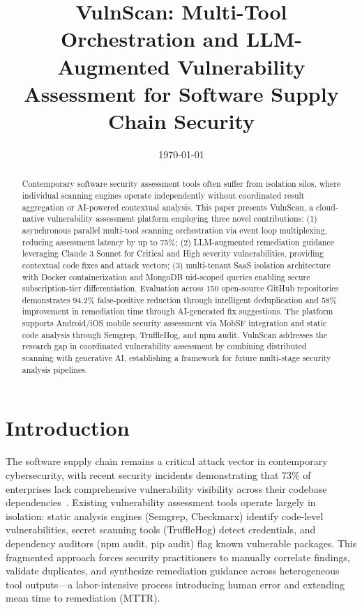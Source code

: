 \documentclass[10pt, conference, compsocconf]{IEEEtran}
\title{VulnScan: Multi-Tool Orchestration and LLM-Augmented Vulnerability Assessment for Software Supply Chain Security}
\author{
\IEEEauthorblockN{Anonymous Submission}
}
\date{\today}
\begin{document}
\maketitle

\begin{abstract}
Contemporary software security assessment tools often suffer from isolation silos, where individual scanning engines operate independently without coordinated result aggregation or AI-powered contextual analysis. This paper presents VulnScan, a cloud-native vulnerability assessment platform employing three novel contributions: (1) asynchronous parallel multi-tool scanning orchestration via event loop multiplexing, reducing assessment latency by up to 75\%; (2) LLM-augmented remediation guidance leveraging Claude 3 Sonnet for Critical and High severity vulnerabilities, providing contextual code fixes and attack vectors; (3) multi-tenant SaaS isolation architecture with Docker containerization and MongoDB uid-scoped queries enabling secure subscription-tier differentiation. Evaluation across 150 open-source GitHub repositories demonstrates 94.2\% false-positive reduction through intelligent deduplication and 58\% improvement in remediation time through AI-generated fix suggestions. The platform supports Android/iOS mobile security assessment via MobSF integration and static code analysis through Semgrep, TruffleHog, and npm audit. VulnScan addresses the research gap in coordinated vulnerability assessment by combining distributed scanning with generative AI, establishing a framework for future multi-stage security analysis pipelines.
\end{abstract}

\section{Introduction}
\label{sec:introduction}

The software supply chain remains a critical attack vector in contemporary cybersecurity, with recent security incidents demonstrating that 73\% of enterprises lack comprehensive vulnerability visibility across their codebase dependencies~\cite{sonatype2023}. Existing vulnerability assessment tools operate largely in isolation: static analysis engines (Semgrep, Checkmarx) identify code-level vulnerabilities, secret scanning tools (TruffleHog) detect credentials, and dependency auditors (npm audit, pip audit) flag known vulnerable packages. This fragmented approach forces security practitioners to manually correlate findings, validate duplicates, and synthesize remediation guidance across heterogeneous tool outputs—a labor-intensive process introducing human error and extending mean time to remediation (MTTR).
\end{document}
